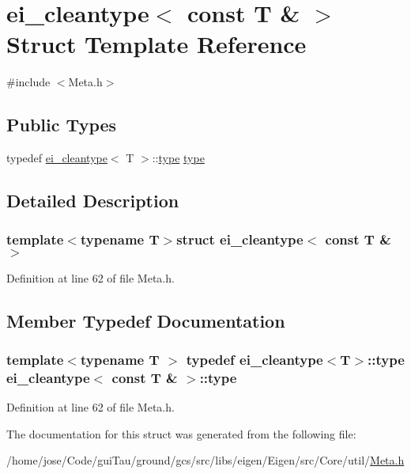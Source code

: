 \hypertarget{structei__cleantype_3_01const_01_t_01_6_01_4}{\section{ei\-\_\-cleantype$<$ const T \& $>$ Struct Template Reference}
\label{structei__cleantype_3_01const_01_t_01_6_01_4}
}


{\ttfamily \#include $<$Meta.\-h$>$}

\subsection*{Public Types}
\begin{DoxyCompactItemize}
\item 
typedef \hyperlink{structei__cleantype}{ei\-\_\-cleantype}$<$ T $>$\-::\hyperlink{structei__cleantype_3_01const_01_t_01_6_01_4_a23f080e907a9be056cb934f95313ded2}{type} \hyperlink{structei__cleantype_3_01const_01_t_01_6_01_4_a23f080e907a9be056cb934f95313ded2}{type}
\end{DoxyCompactItemize}


\subsection{Detailed Description}
\subsubsection*{template$<$typename T$>$struct ei\-\_\-cleantype$<$ const T \& $>$}



Definition at line 62 of file Meta.\-h.



\subsection{Member Typedef Documentation}
\hypertarget{structei__cleantype_3_01const_01_t_01_6_01_4_a23f080e907a9be056cb934f95313ded2}{
\subsubsection[{type}]{\setlength{\rightskip}{0pt plus 5cm}template$<$typename T $>$ typedef {\bf ei\-\_\-cleantype}$<$T$>$\-::{\bf type} {\bf ei\-\_\-cleantype}$<$ const T \& $>$\-::{\bf type}}}\label{structei__cleantype_3_01const_01_t_01_6_01_4_a23f080e907a9be056cb934f95313ded2}


Definition at line 62 of file Meta.\-h.



The documentation for this struct was generated from the following file\-:\begin{DoxyCompactItemize}
\item 
/home/jose/\-Code/gui\-Tau/ground/gcs/src/libs/eigen/\-Eigen/src/\-Core/util/\hyperlink{_meta_8h}{Meta.\-h}\end{DoxyCompactItemize}

